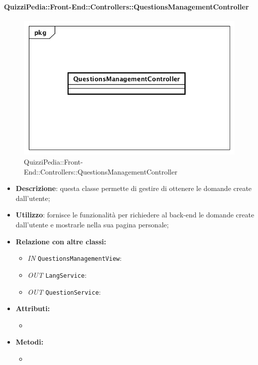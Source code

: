 \paragraph{QuizziPedia::Front-End::Controllers::QuestionsManagementController}
\begin{figure}
	\centering
	\includegraphics[scale=0.45]{UML/Classi/Front-End/QuizziPedia_Front-end_Controller_QuestionsManagementController.png}
	\caption{QuizziPedia::Front-End::Controllers::QuestionsManagementController}
\end{figure}
\begin{itemize}
	\item \textbf{Descrizione}: questa classe permette di gestire di ottenere le domande create dall'utente;
	\item \textbf{Utilizzo}: fornisce le funzionalità per richiedere al back-end le domande create dall'utente e mostrarle nella sua pagina personale; 
	\item \textbf{Relazione con altre classi:}
	\begin{itemize}
		\item \textit{IN} \texttt{QuestionsManagementView}:  
		\item \textit{OUT} \texttt{LangService}:
		\item \textit{OUT} \texttt{QuestionService}: 
	\end{itemize}
	\item \textbf{Attributi:}
	\begin{itemize}
		\item 
	\end{itemize}
	\item \textbf{Metodi:}
	\begin{itemize}
		\item 
	\end{itemize}
\end{itemize}

